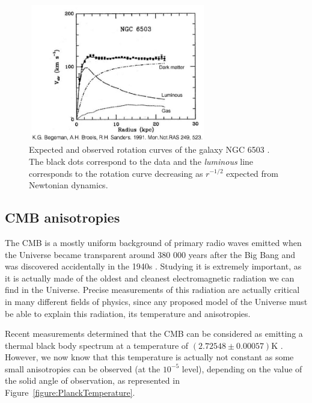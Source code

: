 \documentclass[a4paper, 10pt, openright]{report}
\begin{document}
\begin{figure}[htbp]
\begin{center}
\includegraphics[width=7.8cm, height=6cm]{figs/RotationCurve.jpeg}
\caption{Expected and observed rotation curves of the galaxy NGC 6503 \cite{RotationCurves}. The black dots correspond to the data and the \textit{luminous} line corresponds to the rotation curve decreasing as $r^{-1/2}$ expected from Newtonian dynamics.}
\label{figure:RotationCurves}
\end{center}
\end{figure}

\vspace{-10pt}
\subsection{\acf{CMB} anisotropies} \label{subsection:CMB}

The \ac{CMB} is a mostly uniform background of primary radio waves emitted when the Universe became transparent around 380 000 years after the Big Bang and was discovered accidentally in the 1940s \cite{CMBDiscovery}. Studying it is extremely important, as it is actually made of the oldest and cleanest electromagnetic radiation we can find in the Universe. Precise measurements of this radiation are actually critical in many different fields of physics, since any proposed model of the Universe must be able to explain this radiation, its temperature and anisotropies. 

Recent measurements determined that the \ac{CMB} can be considered as emitting a thermal black body spectrum at a temperature of $(2.72548\pm 0.00057)$K \cite{CMBTemperature}. However, we now know that this temperature is actually not constant as some small anisotropies can be observed (at the $10^{-5}$ level), depending on the value of the solid angle of observation, as represented in Figure~\ref{figure:PlanckTemperature}.
\end{document}
